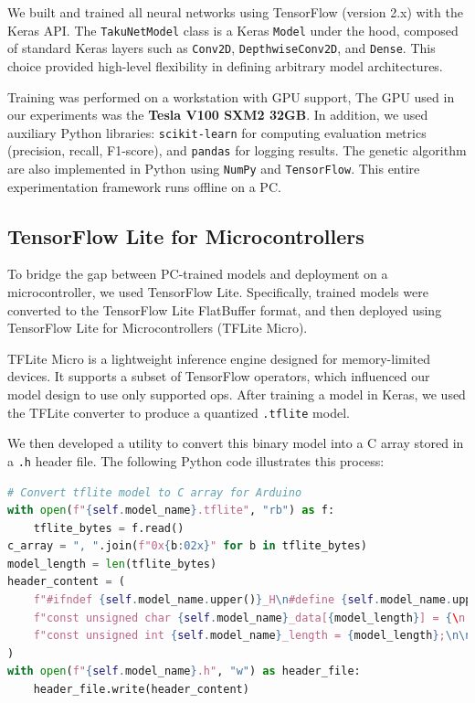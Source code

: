 We built and trained all neural networks using TensorFlow (version 2.x) with the Keras API. The \texttt{TakuNetModel} class is a Keras \texttt{Model} under the hood, composed of standard Keras layers such as \texttt{Conv2D}, \texttt{DepthwiseConv2D}, and \texttt{Dense}. This choice provided high-level flexibility in defining arbitrary model architectures.

Training was performed on a workstation with GPU support, The GPU used in our experiments was the \textbf{Tesla V100 SXM2 32GB}.
In addition, we used auxiliary Python libraries: \texttt{scikit-learn} for computing evaluation metrics (precision, recall, F1-score), and \texttt{pandas} for logging results. The genetic algorithm are also implemented in Python using \texttt{NumPy} and \texttt{TensorFlow}. This entire experimentation framework runs offline on a PC.

\subsection*{TensorFlow Lite for Microcontrollers}

To bridge the gap between PC-trained models and deployment on a microcontroller, we used TensorFlow Lite. Specifically, trained models were converted to the TensorFlow Lite FlatBuffer format, and then deployed using TensorFlow Lite for Microcontrollers (TFLite Micro).

TFLite Micro is a lightweight inference engine designed for memory-limited devices. It supports a subset of TensorFlow operators, which influenced our model design to use only supported ops. After training a model in Keras, we used the TFLite converter to produce a quantized \texttt{.tflite} model.

We then developed a utility to convert this binary model into a C array stored in a \texttt{.h} header file. The following Python code illustrates this process:

\begin{lstlisting}[language=Python, caption={Convert a TFLite model to a C header array for Arduino deployment}, label=lst:tflite_to_c_array]
# Convert tflite model to C array for Arduino
with open(f"{self.model_name}.tflite", "rb") as f:
    tflite_bytes = f.read()
c_array = ", ".join(f"0x{b:02x}" for b in tflite_bytes)
model_length = len(tflite_bytes)
header_content = (
    f"#ifndef {self.model_name.upper()}_H\n#define {self.model_name.upper()}_H\n\n"
    f"const unsigned char {self.model_name}_data[{model_length}] = {\n    {c_array}\n}};\n"
    f"const unsigned int {self.model_name}_length = {model_length};\n\n#endif"
)
with open(f"{self.model_name}.h", "w") as header_file:
    header_file.write(header_content)
\end{lstlisting}

